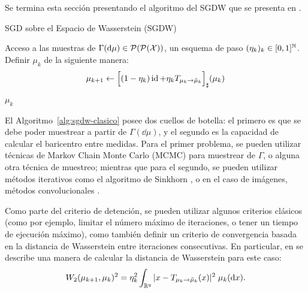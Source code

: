 Se termina esta sección presentando el algoritmo del SGDW que se presenta en \cite{backhoff2022bayesian}.
\begin{algorithm}[H]
    \caption{SGD sobre el Espacio de Wasserstein (SGDW) \cite{backhoff2022bayesian}}
    \label{alg:sgdw-clasico}
    \begin{algorithmic}[1]
        \Require Acceso a las muestras de $\Gamma(\dd \mu) \in \ProbSpace[\ProbSpace]$, un esquema de paso $(\eta_k)_k \in [0, 1]^\N$.
        \Repeat
        \State Definir $\mu_k$ de la siguiente manera:
        \begin{equation}
            \mu_{k+1} \gets \pf{\qty\Big[
                    (1 - \eta_k) \id + \eta_k T_{\mu_k \to \tilde \mu_k}
                ]} (\mu_k)
        \end{equation}
        \State\Return $\mu_k$
    \end{algorithmic}
\end{algorithm}


El Algoritmo~\ref{alg:sgdw-clasico} posee dos cuellos de botella: el primero es que se debe poder muestrear a partir de $\Gamma(\dd \mu)$, y el segundo es la capacidad de calcular el baricentro entre medidas. Para el primer problema, se pueden utilizar técnicas de Markov Chain Monte Carlo (MCMC) \cite{andrieu2003introduction,brooks2011handbook,goodman2010ensemble} para muestrear de $\Gamma$, o alguna otra técnica de muestreo; mientras que para el segundo, se pueden utilizar métodos iterativos como el algoritmo de Sinkhorn \cite{cuturi2013sinkhorn}, o en el caso de imágenes, métodos convolucionales \cite{solomon2015convolutional,janati2020debiased}.

Como parte del criterio de detención, se pueden utilizar algunos criterios clásicos (como por ejemplo, limitar el número máximo de iteraciones, o tener un tiempo de ejecución máximo), como también definir un criterio de convergencia basada en la distancia de Wasserstein entre iteraciones consecutivas. En particular, en \cite{backhoff2022bayesian} se describe una manera de calcular la distancia de Wasserstein para este caso:
\begin{equation}
    \Wasserstein[2]{\mu_{k+1}}{\mu_k}^2 = \eta_k^2 \int_{\R^q} | x - T_{\mu_k \to \tilde \mu_k}(x) |^2 \; \mu_k(\dd x).
\end{equation}




